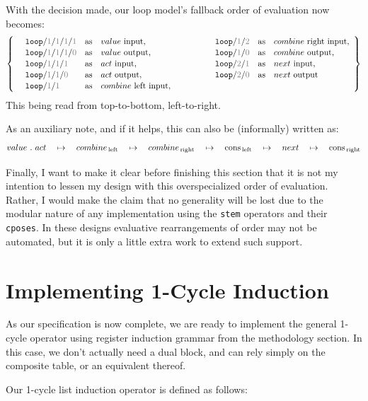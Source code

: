 \documentclass[twoside]{article}
\newcommand{\qmapsto}{\ensuremath{\quad \mapsto \quad}}
\newcommand{\as}{\mbox{as}}
\newcommand{\vi}[1][\_]{\mbox{$value$#1input}}
\newcommand{\vo}[1][\_]{\mbox{$value$#1output}}
\newcommand{\ai}[1][\_]{\mbox{$act$#1input}}
\newcommand{\ao}[1][\_]{\mbox{$act$#1output}}
\newcommand{\cli}[1][\_]{\mbox{$combine$#1left#1input}}
\newcommand{\cri}[1][\_]{\mbox{$combine$#1right#1input}}
\newcommand{\co}[1][\_]{\mbox{$combine$#1output}}
\newcommand{\nei}[1][\_]{\mbox{$next$#1input}}
\newcommand{\no}[1][\_]{\mbox{$next$#1output}}
\newcommand{\tab}[1][1.125cm]{\hspace{#1}}
\newcommand{\col}[1][0ex]{& \hspace{#1}}
\newcommand{\msbox}[1]{\ensuremath{_{\mbox{\scriptsize #1}}}}
\newcommand{\tcg}[1]{\textcolor{gray}{#1}}
\newcommand{\tlp}{\texttt{\mbox{loop}}}
\newcommand{\cons}{\mbox{cons}}
\begin{document}
With the decision made, our loop model's fallback order of evaluation now becomes:
$$ \def\arraystretch{1.1}\left\{\tab[2ex]\begin{array}{lcllcl}
\tlp/\tcg{1}/\tcg{1}/\tcg{1}/\tcg{1}	& \as & \vi[ ],		\col[10ex] \tlp/\tcg{1}/\tcg{2}	& \as & \cri[ ],	\\
\tlp/\tcg{1}/\tcg{1}/\tcg{1}/\tcg{0}	& \as & \vo[ ],		\col[10ex] \tlp/\tcg{1}/\tcg{0}	& \as & \co[ ],		\\
\tlp/\tcg{1}/\tcg{1}/\tcg{1}		& \as & \ai[ ],		\col[10ex] \tlp/\tcg{2}/\tcg{1}	& \as & \nei[ ],	\\
\tlp/\tcg{1}/\tcg{1}/\tcg{0}		& \as & \ao[ ],		\col[10ex] \tlp/\tcg{2}/\tcg{0}	& \as & \no[ ]		\\
\tlp/\tcg{1}/\tcg{1}			& \as & \cli[ ],
\end{array}\right\} $$
This being read from top-to-bottom, left-to-right.

As an auxiliary note, and if it helps, this can also be (informally) written as:
$$ value\ .\ act \qmapsto combine\msbox{\,left} \qmapsto combine\msbox{\,right}
\qmapsto \cons\msbox{\,left} \qmapsto next \qmapsto \cons\msbox{\,right} $$

Finally, I want to make it clear before finishing this section that it is not my intention to lessen my design with
this overspecialized order of evaluation. Rather, I would make the claim that no generality will be lost due to the
modular nature of any implementation using the \texttt{stem} operators and their \texttt{cposes}. In these designs
evaluative rearrangements of order may not be automated, but it is only a little extra work to extend such support.

\section*{Implementing 1-Cycle Induction}

As our specification is now complete, we are ready to implement the general 1-cycle operator using register induction
grammar from the methodology section. In this case, we don't actually need a dual block, and can rely simply on
the composite table, or an equivalent thereof.

Our 1-cycle list induction operator is defined as follows:
\end{document}
